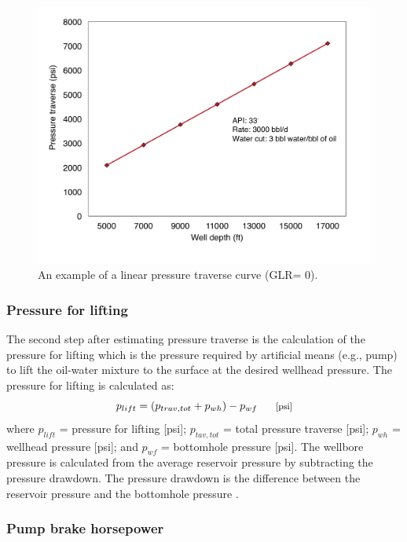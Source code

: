 \documentclass[11pt]{report}
\newcommand{\marg}[1]{{\footnotesize\textit{\textcolor{stanford}{'#1'}}}}
\newcommand{\marginnote}[1]{\marginpar{\marg{#1}}}
\begin{document}
\begin{figure}[t]
\includegraphics[width=0.8\columnwidth]{images/phase_flow_study.pdf}
\caption{An example of a linear pressure traverse curve (GLR= 0).}
\label{fig:phase_comparison}
\end{figure}

\subsubsection{Pressure for lifting}

The second step after estimating pressure traverse is the calculation of the pressure for lifting which is the pressure required by artificial means (e.g., pump) to lift the oil-water mixture to the surface at the desired wellhead pressure. The pressure for lifting is calculated as: \marginnote{Production \& Extraction 2.2.2} 
\begin{equation} \label{eq:pressure_lifting}
p_{lift}=(p_{trav,tot}+p_{wh})-p_{wf} \begin{footnotesize} \quad\quad\text{[psi]} \end{footnotesize}
\end{equation}
where $p_{lift}$ = pressure for lifting [psi]; $p_{tav,tot}$ = total pressure traverse [psi]; $p_{wh}$ = wellhead pressure [psi]; and $p_{wf}$ = bottomhole pressure [psi]. The wellbore pressure is calculated from the average reservoir pressure by subtracting the pressure drawdown. The pressure drawdown is the difference between the reservoir pressure and the bottomhole pressure \cite[p. 22]{Takacs2005}.

\subsubsection{Pump brake horsepower}
\end{document}
